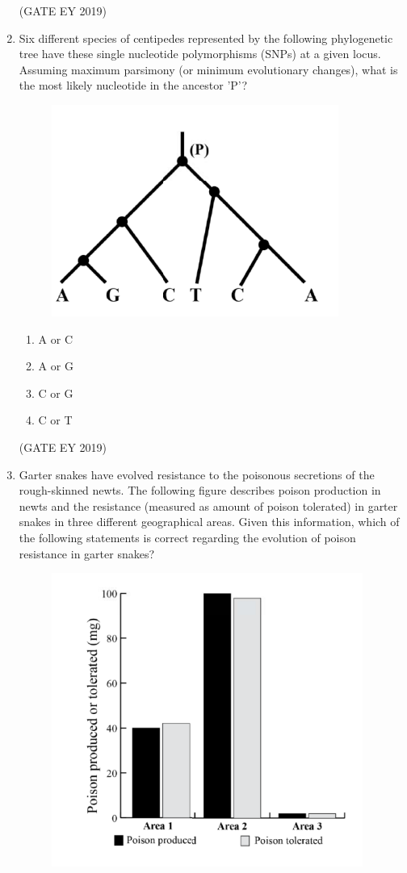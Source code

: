 \documentclass[journal,12pt,onecolumn]{IEEEtran}
\theoremstyle{remark}
\begin{document}
\begin{enumerate}
\hfill{(GATE EY 2019)}
\item Six different species of centipedes represented by the following phylogenetic tree have these single nucleotide polymorphisms (SNPs) at a given locus. Assuming maximum parsimony (or minimum evolutionary changes), what is the most likely nucleotide in the ancestor 'P'?
\begin{figure}[H]
    \centering
    \includegraphics[]{figs/34.png}
\end{figure}

\begin{multicols}{2}
\begin{enumerate}
\item A or C
\item A or G
\item C or G
\item C or T
\end{enumerate}
\end{multicols}
\hfill{(GATE EY 2019)}

\item Garter snakes have evolved resistance to the poisonous secretions of the rough-skinned newts. The following figure describes poison production in newts and the resistance (measured as amount of poison tolerated) in garter snakes in three different geographical areas. Given this information, which of the following statements is correct regarding the evolution of poison resistance in garter snakes?
\begin{figure}[h]
    \centering
    \includegraphics[]{figs/35.png}
\end{figure}


\end{enumerate}
\end{document}
